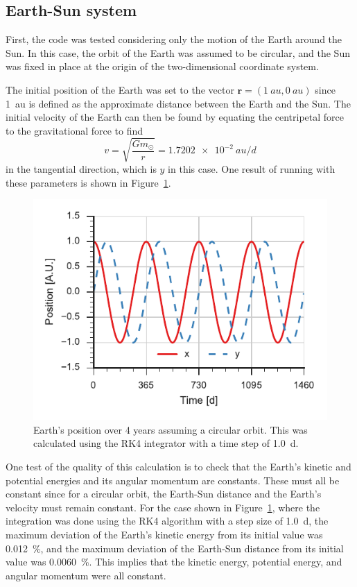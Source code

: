 \documentclass[aps,prc,reprint,nobalancelastpage]{revtex4-1}
\newcommand{\sun}[0]{\ensuremath{\odot}}
\begin{document}
    \subsection{Earth-Sun system}
    \label{sub:earthsun}

        First, the code was tested considering only the motion of the Earth around the Sun. In this case, the orbit of the Earth was assumed to be circular, and the Sun was fixed in place at the origin of the two-dimensional coordinate system.

        The initial position of the Earth was set to the vector $\mathbf{r} = (\SI{1}{au}, \SI{0}{au})$ since \SI{1}{au} is defined as the approximate distance between the Earth and the Sun. The initial velocity of the Earth can then be found by equating the centripetal force to the gravitational force to find
        \begin{equation*}
            v = \sqrt{\frac{G m_\sun}{r}} = \SI{1.7202e-2}{au/d}
        \end{equation*}
        in the tangential direction, which is $y$ in this case. \cite{Goldstein2002} One result of running with these parameters is shown in Figure~\ref{fig:earthrk4}.

        \begin{figure}
            \includegraphics{earthpos_rk4.pdf}
            \caption{Earth's position over 4 years assuming a circular orbit. This was calculated using the RK4 integrator with a time step of \SI{1.0}{d}.}
            \label{fig:earthrk4}
        \end{figure}

        One test of the quality of this calculation is to check that the Earth's kinetic and potential energies and its angular momentum are constants. These must all be constant since for a circular orbit, the Earth-Sun distance and the Earth's velocity must remain constant. For the case shown in Figure~\ref{fig:earthrk4}, where the integration was done using the RK4 algorithm with a step size of \SI{1.0}{d}, the maximum deviation of the Earth's kinetic energy from its initial value was \SI{0.012}{\percent}, and the maximum deviation of the Earth-Sun distance from its initial value was \SI{0.0060}{\percent}. This implies that the kinetic energy, potential energy, and angular momentum were all constant.
\end{document}
